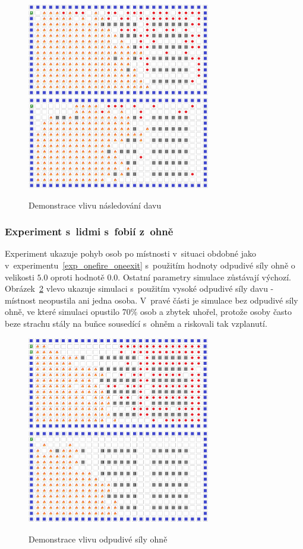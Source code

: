 \documentclass[11pt, titlepage, a4paper]{article}
\begin{document}
        \begin{figure}[H]
            \includegraphics[width=8cm]{TestParams/highCrow}
            \includegraphics[width=8cm]{TestParams/noCrow}
            \caption{Demonstrace vlivu následování davu}
            \label{testCrow}
        \end{figure}


        \subsubsection{Experiment s~lidmi s~fobií z~ohně}
        Experiment ukazuje pohyb osob po místnosti v~situaci obdobné jako v~experimentu~\ref{exp_onefire_oneexit} s~použitím hodnoty odpudivé síly ohně o velikosti $5.0$ oproti hodnotě $0.0$. Ostatní parametry simulace zůstávají výchozí. Obrázek~\ref{testFire} vlevo ukazuje simulaci s~použitím vysoké odpudivé síly davu - místnost neopustila ani jedna osoba. V~pravé části je simulace bez odpudivé síly ohně, ve které simulaci opustilo 70\% osob a zbytek uhořel, protože osoby často beze strachu stály na buňce sousedící s~ohněm a riskovali tak vzplanutí.\\

        \begin{figure}[H]
            \includegraphics[width=8cm]{TestParams/highFire}
            \includegraphics[width=8cm]{TestParams/noFire}
            \caption{Demonstrace vlivu odpudivé síly ohně}
            \label{testFire}
        \end{figure}
\end{document}
